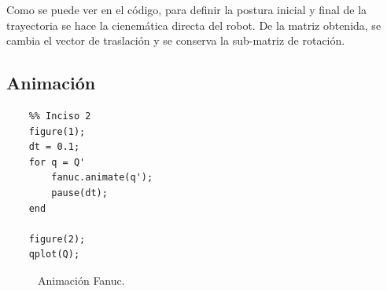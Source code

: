 \documentclass[a4paper,12pt]{article}
\begin{document}
Como se puede ver en el código, para definir la postura inicial y final
de la trayectoria se hace la cienemática directa del robot. De la matriz obtenida,
se cambia el vector de traslación y se conserva la sub-matriz de rotación.

\subsection{Animación}
\begin{lstlisting}
    %% Inciso 2
    figure(1);
    dt = 0.1;
    for q = Q'
        fanuc.animate(q');
        pause(dt);
    end

    figure(2);
    qplot(Q);
\end{lstlisting}

\begin{figure}[H]
    \centering
    \begin{adjustbox}{scale = 0.65, max width=\columnwidth}
    \end{adjustbox}
    \caption{Animación Fanuc.}
\end{figure}
\end{document}
